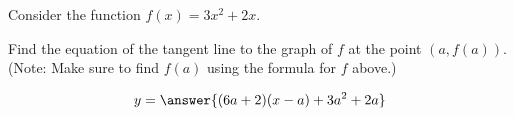 \documentclass{ximera}
\author{Steven Gubkin\and Nela Lakos}
\begin{document}
\begin{exercise}

Consider the function $f(x) = 3x^2 + 2x$.

Find the equation of the tangent line to the graph of $f$ at the point $(a,f(a))$.
(Note: Make sure to find $f(a)$ using the formula for $f$ above.)

\begin{prompt}
	\[
	y = \answer{(6a+2)(x-a)+3a^2+2a}
	\]
\end{prompt}




\end{exercise}
\end{document}
